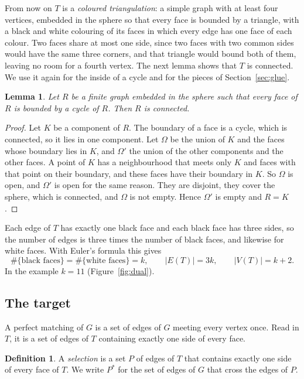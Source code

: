 \documentclass[10pt]{amsart}
\numberwithin{equation}{section}
\newtheorem{lemma}[equation]{Lemma}
\theoremstyle{definition}
\newtheorem{definition}[equation]{Definition}
\theoremstyle{remark}
\newcommand{\T}{T}
\begin{document}
From now on $\T$ is a \emph{coloured triangulation}: a simple graph with at least four vertices, embedded in the sphere so that every face is bounded by a triangle, with a black and white colouring of its faces in which every edge has one face of each colour.
Two faces share at most one side, since two faces with two common sides would have the same three corners, and that triangle would bound both of them, leaving no room for a fourth vertex.
The next lemma shows that $\T$ is connected.
We use it again for the inside of a cycle and for the pieces of Section~\ref{sec:glue}.

\begin{lemma}\label{lem:connected}
Let $R$ be a finite graph embedded in the sphere such that every face of $R$ is bounded by a cycle of $R$.
Then $R$ is connected.
\end{lemma}

\begin{proof}
Let $K$ be a component of $R$.
The boundary of a face is a cycle, which is connected, so it lies in one component.
Let $\Omega$ be the union of $K$ and the faces whose boundary lies in $K$, and $\Omega'$ the union of the other components and the other faces.
A point of $K$ has a neighbourhood that meets only $K$ and faces with that point on their boundary, and these faces have their boundary in $K$.
So $\Omega$ is open, and $\Omega'$ is open for the same reason.
They are disjoint, they cover the sphere, which is connected, and $\Omega$ is not empty.
Hence $\Omega'$ is empty and $R=K$.
\end{proof}

Each edge of $\T$ has exactly one black face and each black face has three sides, so the number of edges is three times the number of black faces, and likewise for white faces.
With Euler's formula this gives
\begin{equation}\label{eq:counts}
\#\{\text{black faces}\}=\#\{\text{white faces}\}=k,\qquad |E(\T)|=3k,\qquad |V(\T)|=k+2 .
\end{equation}
In the example $k=11$ (Figure~\ref{fig:dual}).

\subsection*{The target}
A perfect matching of $G$ is a set of edges of $G$ meeting every vertex once.
Read in $\T$, it is a set of edges of $\T$ containing exactly one side of every face.

\begin{definition}
A \emph{selection} is a set $P$ of edges of $\T$ that contains exactly one side of every face of $\T$.
We write $P^*$ for the set of edges of $G$ that cross the edges of $P$.
\end{definition}
\end{document}

